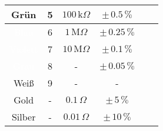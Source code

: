 \begin{frame}
{\begin{figure}[H]
\begin{minipage}[b]{1\textwidth}
{\begin{tabular}{|c|c|c|c|c|c|}
						\hline %
						\cellcolor{green}Grün                         & 5                      & $100\,\text{k}\Omega$  & $\pm\, 0.5\,\%$   \\ %
						\hline %
						\cellcolor{blue}\textcolor{white}{Blau}       & 6                      & $1\,\text{M}\Omega$    & $\pm\, 0.25\,\%$  \\ %
						\hline %
						\cellcolor{violet}\textcolor{white}{Violett}  & 7                      & $10\,\text{M}\Omega$   & $\pm\, 0.1\,\%$   \\ %
						\hline %
						\cellcolor{gray}\textcolor{white}{Grau}       & 8                      & -                      & $\pm\, 0.05\,\%$  \\ %
						\hline %
						Weiß                                          & 9                      & -                      & -                 \\ %
						\hline %
						\cellcolor{gold}Gold                          & -                      & $0.1\,\Omega$          & $\pm\,5\,\%$      \\ %
						\hline %
						\cellcolor{silver}Silber                      & -                      & $0.01\,\Omega$         & $\pm\,10\,\%$     \\ %
						\hline %
					\end{tabular}%
				}
			\end{minipage}
		\end{figure}
		
}
\end{frame}
